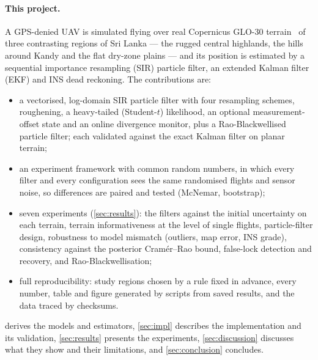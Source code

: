 \paragraph{This project.} A GPS-denied UAV is simulated flying over real Copernicus GLO-30
terrain~\cite{copernicus2022} of three contrasting regions of Sri Lanka --- the rugged central
highlands, the hills around Kandy and the flat dry-zone plains --- and its position is estimated by
a sequential importance resampling (SIR) particle filter, an extended Kalman filter (EKF) and INS
dead reckoning. The contributions are:
\begin{itemize}
  \item a vectorised, log-domain SIR particle filter with four resampling schemes, roughening,
        a heavy-tailed (Student-$t$) likelihood, an optional measurement-offset state and an
        online divergence monitor, plus a Rao-Blackwellised particle filter; each validated against
        the exact Kalman filter on planar terrain;
  \item an experiment framework with common random numbers, in which every filter and every
        configuration sees the same randomised flights and sensor noise, so differences are paired
        and tested (McNemar, bootstrap);
  \item seven experiments (\cref{sec:results}): the filters against the initial uncertainty on
        each terrain, terrain informativeness at the level of single flights, particle-filter
        design, robustness to model mismatch (outliers, map error, INS grade), consistency against
        the posterior Cramér--Rao bound, false-lock detection and recovery, and
        Rao-Blackwellisation;
  \item full reproducibility: study regions chosen by a rule fixed in advance, every number,
        table and figure generated by scripts from saved results, and the data traced by
        checksums.
\end{itemize}
 derives the models and estimators, \cref{sec:impl} describes the
implementation and its validation, \cref{sec:results} presents the experiments,
\cref{sec:discussion} discusses what they show and their limitations, and \cref{sec:conclusion}
concludes.
